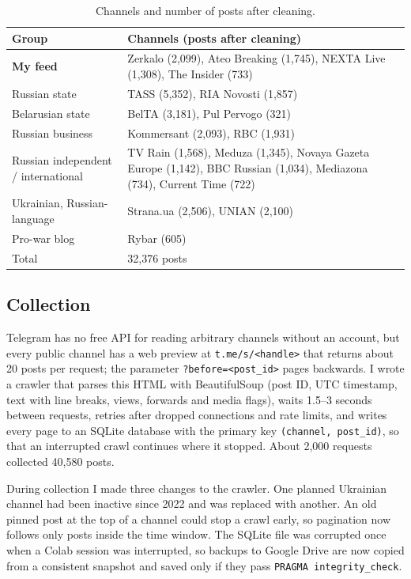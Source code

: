 \documentclass[11pt,a4paper]{article}
\begin{document}
\begin{table}[H]
\centering
\small
\caption{Channels and number of posts after cleaning.}
\label{tab:channels}
\begin{tabularx}{\textwidth}{lX}
\toprule
Group & Channels (posts after cleaning) \\
\midrule
\textbf{My feed} & Zerkalo (2,099), Ateo Breaking (1,745), NEXTA Live (1,308), The Insider (733) \\
Russian state & TASS (5,352), RIA Novosti (1,857) \\
Belarusian state & BelTA (3,181), Pul Pervogo (321) \\
Russian business & Kommersant (2,093), RBC (1,931) \\
Russian independent / international & TV Rain (1,568), Meduza (1,345), Novaya Gazeta Europe (1,142), BBC Russian (1,034), Mediazona (734), Current Time (722) \\
Ukrainian, Russian-language & Strana.ua (2,506), UNIAN (2,100) \\
Pro-war blog & Rybar (605) \\
\midrule
Total & 32,376 posts \\
\bottomrule
\end{tabularx}
\end{table}

\subsection{Collection}
Telegram has no free API for reading arbitrary channels without an account, but every public channel has a web preview at \texttt{t.me/s/<handle>} that returns about 20 posts per request; the parameter \texttt{?before=<post\_id>} pages backwards. I wrote a crawler that parses this HTML with BeautifulSoup (post ID, UTC timestamp, text with line breaks, views, forwards and media flags), waits 1.5--3 seconds between requests, retries after dropped connections and rate limits, and writes every page to an SQLite database with the primary key \texttt{(channel, post\_id)}, so that an interrupted crawl continues where it stopped. About 2,000 requests collected 40,580 posts.

During collection I made three changes to the crawler. One planned Ukrainian channel had been inactive since 2022 and was replaced with another. An old pinned post at the top of a channel could stop a crawl early, so pagination now follows only posts inside the time window. The SQLite file was corrupted once when a Colab session was interrupted, so backups to Google Drive are now copied from a consistent snapshot and saved only if they pass \texttt{PRAGMA integrity\_check}.
\end{document}
